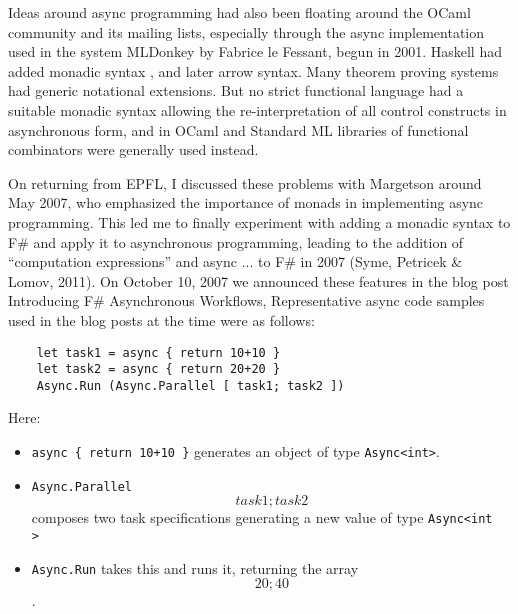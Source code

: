 \documentclass[acmsmall,review]{acmart}\settopmatter{printfolios=true,printccs=false,printacmref=false}
\begin{document}
Ideas around async programming had also been floating around the OCaml community and its mailing lists, especially through the async implementation used in the system MLDonkey by Fabrice le Fessant, begun in 2001.  Haskell had added monadic syntax , and later arrow syntax.  Many theorem proving systems had generic notational extensions. But no strict functional language had a suitable monadic syntax allowing the re-interpretation of all control constructs in asynchronous form, and in OCaml and Standard ML libraries of functional combinators were generally used instead.  

On returning from EPFL, I discussed these problems with Margetson around May 2007, who emphasized the importance of monads in implementing async programming. This led me to finally experiment with adding a monadic syntax to F\# and apply it to asynchronous programming, leading to the addition of “computation expressions” and async { ... } to F\# in 2007 (Syme, Petricek \& Lomov, 2011).  On October 10, 2007 we announced these features in the blog post Introducing F\# Asynchronous Workflows,  Representative async code samples used in the blog posts at the time were as follows:

\begin{verbatim}
    let task1 = async { return 10+10 }
    let task2 = async { return 20+20 }
    Async.Run (Async.Parallel [ task1; task2 ])
\end{verbatim}

Here:
\begin{itemize}
\item \texttt{async \{ return 10+10 \}} generates an object of type \texttt{Async<int>}.  
\item \texttt{Async.Parallel \[ task1; task2 \]} composes two task specifications generating a new value of type \texttt{Async<int\[\]>}
\item \texttt{Async.Run} takes this and runs it, returning the array \texttt{\[20; 40\]}. 
\end{itemize}
\end{document}

